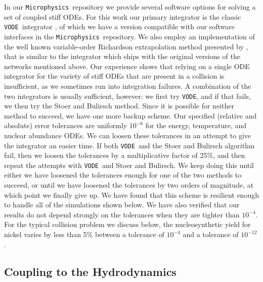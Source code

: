 \documentclass[twocolumn,numberedappendix]{../aastex6}
\newcommand{\microphysics}{\texttt{Microphysics}}
\newcommand{\vode}{\texttt{VODE}}
\begin{document}
In our \microphysics\ repository we provide several software options for
solving a set of coupled stiff ODEs. For this work our primary integrator
is the classic \vode\ integrator \citep{vode}, of which we have a version
compatible with our software interfaces in the \microphysics\ repository.
We also employ an implementation of the well known variable-order Richardson
extrapolation method presented by \citet{stoer:1980}, that is similar to the
integrator which ships with the original versions of the networks mentioned
above. Our experience shows that relying on a single ODE integrator for the
variety of stiff ODEs that are present in a collision is insufficient, as we
sometimes run into integration failures. A combination of the two integrators
is usually sufficient, however: we first try \vode, and if that fails, we then
try the Stoer and Bulirsch method. Since it is possible for neither method to
succeed, we have one more backup scheme. Our specified (relative and absolute)
error tolerances are uniformly $10^{-6}$ for the energy, temperature, and nuclear
abundance ODEs. We can loosen these tolerances in an attempt to give the integrator
an easier time. If both \vode\ and the Stoer and Bulirsch algorithm fail, then we
loosen the tolerances by a multiplicative factor of 25\%, and then repeat the attempts
with \vode\ and Stoer and Bulirsch. We keep doing this until either we have loosened
the tolerances enough for one of the two methods to succeed, or until we have loosened
the tolerances by two orders of magnitude, at which point we finally give up. We have
found that this scheme is resilient enough to handle all of the simulations shown below.
We have also verified that our results do not depend strongly on the tolerances when they
are tighter than $10^{-4}$. For the typical collision problem we discuss below, the
nucleosynthetic yield for nickel varies by less than 5\% between a tolerance of $10^{-4}$
and a tolerance of $10^{-12}$.

\subsection{Coupling to the Hydrodynamics}
\label{sec:hydrocoupling}
\end{document}
